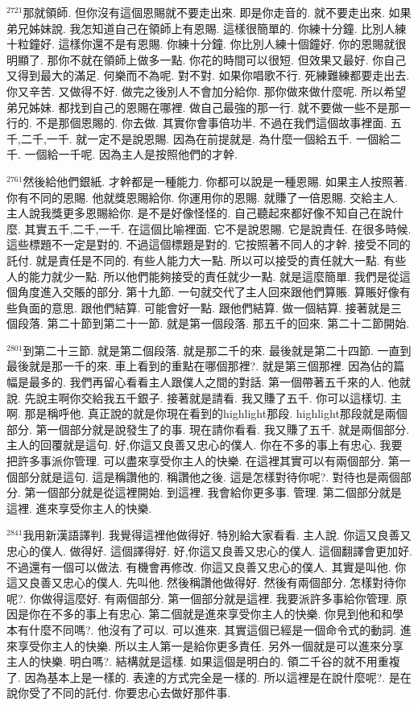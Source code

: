 \documentclass{book}
\begin{document}
$^{2721}$那就領師.
但你沒有這個恩賜就不要走出來.
即是你走音的.
就不要走出來.
如果弟兄姊妹說.
我怎知道自己在領師上有恩賜.
這樣很簡單的.
你練十分鐘.
比別人練十粒鐘好.
這樣你還不是有恩賜.
你練十分鐘.
你比別人練十個鐘好.
你的恩賜就很明顯了.
那你不就在領師上做多一點.
你花的時間可以很短.
但效果又最好.
你自己又得到最大的滿足.
何樂而不為呢.
對不對.
如果你唱歌不行.
死練難練都要走出去.
你又辛苦.
又做得不好.
做完之後別人不會加分給你.
那你做來做什麼呢.
所以希望弟兄姊妹.
都找到自己的恩賜在哪裡.
做自己最強的那一行.
就不要做一些不是那一行的.
不是那個恩賜的.
你去做.
其實你會事倍功半.
不過在我們這個故事裡面.
五千,二千,一千.
就一定不是說恩賜.
因為在前提就是.
為什麼一個給五千.
一個給二千.
一個給一千呢.
因為主人是按照他們的才幹.

$^{2761}$然後給他們銀紙.
才幹都是一種能力.
你都可以說是一種恩賜.
如果主人按照著.
你有不同的恩賜.
他就獎恩賜給你.
你運用你的恩賜.
就賺了一倍恩賜.
交給主人.
主人說我獎更多恩賜給你.
是不是好像怪怪的.
自己聽起來都好像不知自己在說什麼.
其實五千,二千,一千.
在這個比喻裡面.
它不是說恩賜.
它是說責任.
在很多時候.
這些標題不一定是對的.
不過這個標題是對的.
它按照著不同人的才幹.
接受不同的託付.
就是責任是不同的.
有些人能力大一點.
所以可以接受的責任就大一點.
有些人的能力就少一點.
所以他們能夠接受的責任就少一點.
就是這麼簡單.
我們是從這個角度進入交賬的部分.
第十九節.
一句就交代了主人回來跟他們算賬.
算賬好像有些負面的意思.
跟他們結算.
可能會好一點.
跟他們結算.
做一個結算.
接著就是三個段落.
第二十節到第二十一節.
就是第一個段落.
那五千的回來.
第二十二節開始.

$^{2801}$到第二十三節.
就是第二個段落.
就是那二千的來.
最後就是第二十四節.
一直到最後就是那一千的來.
車上看到的重點在哪個那裡?.
就是第三個那裡.
因為佔的篇幅是最多的.
我們再留心看看主人跟僕人之間的對話.
第一個帶著五千來的人.
他就說.
先說主啊你交給我五千銀子.
接著就是請看.
我又賺了五千.
你可以這樣切.
主啊.
那是稱呼他.
真正說的就是你現在看到的highlight那段.
highlight那段就是兩個部分.
第一個部分就是說發生了的事.
現在請你看看.
我又賺了五千.
就是兩個部分.
主人的回覆就是這句.
好,你這又良善又忠心的僕人.
你在不多的事上有忠心.
我要把許多事派你管理.
可以盡來享受你主人的快樂.
在這裡其實可以有兩個部分.
第一個部分就是這句.
這是稱讚他的.
稱讚他之後.
這是怎樣對待你呢?.
對待也是兩個部分.
第一個部分就是從這裡開始.
到這裡.
我會給你更多事.
管理.
第二個部分就是這裡.
進來享受你主人的快樂.

$^{2841}$我用新漢語譯判.
我覺得這裡他做得好.
特別給大家看看.
主人說.
你這又良善又忠心的僕人.
做得好.
這個譯得好.
好,你這又良善又忠心的僕人.
這個翻譯會更加好.
不過還有一個可以做法.
有機會再修改.
你這又良善又忠心的僕人.
其實是叫他.
你這又良善又忠心的僕人.
先叫他.
然後稱讚他做得好.
然後有兩個部分.
怎樣對待你呢?.
你做得這麼好.
有兩個部分.
第一個部分就是這裡.
我要派許多事給你管理.
原因是你在不多的事上有忠心.
第二個就是進來享受你主人的快樂.
你見到他和和學本有什麼不同嗎?.
他沒有了可以.
可以進來.
其實這個已經是一個命令式的動詞.
進來享受你主人的快樂.
所以主人第一是給你更多責任.
另外一個就是可以進來分享主人的快樂.
明白嗎?.
結構就是這樣.
如果這個是明白的.
領二千谷的就不用重複了.
因為基本上是一樣的.
表達的方式完全是一樣的.
所以這裡是在說什麼呢?.
是在說你受了不同的託付.
你要忠心去做好那件事.
\end{document}
